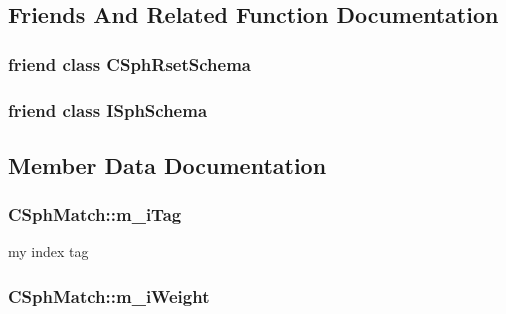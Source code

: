 \subsection{Friends And Related Function Documentation}
\hypertarget{classCSphMatch_ae9fc32f1e11e9afd5d44b12b60e68c65}{
\subsubsection[{C\-Sph\-Rset\-Schema}]{\setlength{\rightskip}{0pt plus 5cm}friend class {\bf C\-Sph\-Rset\-Schema}\hspace{0.3cm}{\ttfamily [friend]}}}\label{classCSphMatch_ae9fc32f1e11e9afd5d44b12b60e68c65}
\hypertarget{classCSphMatch_a71032285b4b7b738d8cecf822e75835d}{
\subsubsection[{I\-Sph\-Schema}]{\setlength{\rightskip}{0pt plus 5cm}friend class {\bf I\-Sph\-Schema}\hspace{0.3cm}{\ttfamily [friend]}}}\label{classCSphMatch_a71032285b4b7b738d8cecf822e75835d}


\subsection{Member Data Documentation}
\hypertarget{classCSphMatch_adedc90b09bad49652b89d01766852ae9}{
\subsubsection[{m\-\_\-i\-Tag}]{ C\-Sph\-Match\-::m\-\_\-i\-Tag}}\label{classCSphMatch_adedc90b09bad49652b89d01766852ae9}


my index tag 

\hypertarget{classCSphMatch_a5da02dba11f9375ea4e83d9b0e02b662}{
\subsubsection[{m\-\_\-i\-Weight}]{ C\-Sph\-Match\-::m\-\_\-i\-Weight}}\label{classCSphMatch_a5da02dba11f9375ea4e83d9b0e02b662}


